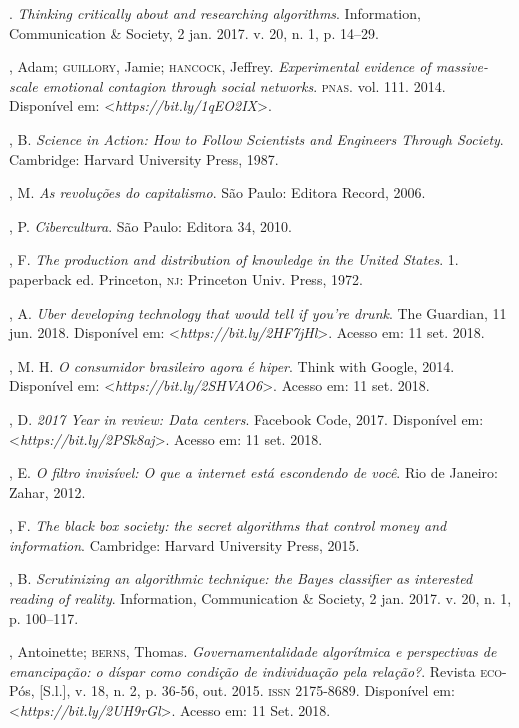 \begin{bibliohedra}
\titidem. \emph{Thinking critically about and researching
algorithms}. Information, Communication \& Society, 2 jan. 2017. v. 20,
n. 1, p. 14--29.

, Adam; \textsc{guillory}, Jamie; \textsc{hancock}, Jeffrey. \emph{Experimental evidence of massive-scale emotional contagion through social networks}. \textsc{pnas}. vol.
111. 2014. Disponível em: \textless{}\emph{https://bit.ly/1qEO2IX}\textgreater{}.

, B. \emph{Science in Action: How to Follow Scientists and
Engineers Through Society}. Cambridge: Harvard University Press, 1987.

, M. \emph{As revoluções do capitalismo}. São Paulo: Editora
Record, 2006.

, P. \emph{Cibercultura}. São Paulo: Editora 34, 2010.

, F. \emph{The production and distribution of knowledge in the
United States}. 1. paperback ed. Princeton, \textsc{nj}: Princeton Univ.
Press, 1972.

, A. \emph{Uber developing technology that would tell if you're
drunk}. The Guardian, 11 jun. 2018. Disponível em: \textless{}\emph{https://bit.ly/2HF7jHl}\textgreater{}.
Acesso em: 11 set. 2018.

, M. H. \emph{O consumidor brasileiro agora é hiper}. Think
with Google, 2014. Disponível em: \textless{}\emph{https://bit.ly/2SHVAO6}\textgreater{}.
Acesso em: 11 set. 2018.

, D. \emph{2017 Year in review: Data centers}. Facebook Code,
2017. Disponível em: \textless{}\emph{https://bit.ly/2PSk8aj}\textgreater{}. Acesso em: 11 set. 2018.

, E. \emph{O filtro invisível: O que a internet está escondendo
de você}. Rio de Janeiro: Zahar, 2012.

, F. \emph{The black box society: the secret algorithms that
control money and information}. Cambridge: Harvard University Press,
2015.

, B. \emph{Scrutinizing an algorithmic technique: the Bayes
classifier as interested reading of reality}. Information, Communication
\& Society, 2 jan. 2017. v. 20, n. 1, p. 100--117.

, Antoinette; \textsc{berns}, Thomas. \emph{Governamentalidade
algorítmica e perspectivas de emancipação: o díspar como condição de
individuação pela relação?}. Revista \textsc{eco}-Pós, [S.l.], v. 18, n. 2, p.
36-56, out. 2015. \textsc{issn} 2175-8689. Disponível em:
\textless{}\emph{https://bit.ly/2UH9rGl}\textgreater{}. Acesso em: 11 Set. 2018.


\end{bibliohedra}
